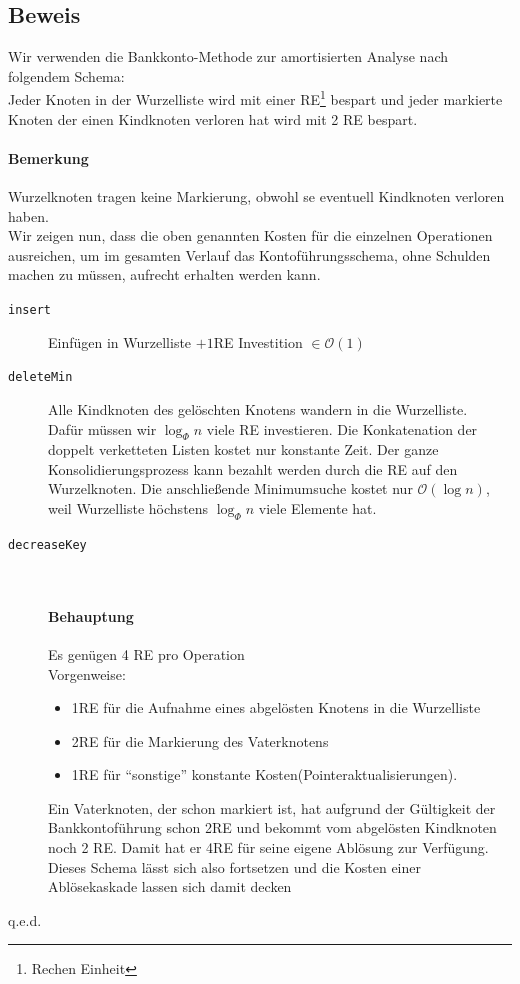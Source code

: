 \subsection{Beweis}
Wir verwenden die Bankkonto-Methode zur amortisierten Analyse nach folgendem Schema:\\
Jeder Knoten in der Wurzelliste wird mit einer RE\footnote{Rechen Einheit} bespart und jeder markierte Knoten der einen Kindknoten verloren hat wird mit 2 RE bespart.
\paragraph{Bemerkung}
Wurzelknoten tragen keine Markierung, obwohl se eventuell Kindknoten verloren haben.\\

Wir zeigen nun, dass die oben genannten Kosten für die einzelnen Operationen ausreichen, um im gesamten Verlauf das Kontoführungsschema, ohne Schulden machen zu müssen, aufrecht erhalten werden kann.\\
\begin{description}
	\item[\texttt{insert}] Einfügen in Wurzelliste $+1$RE Investition $\in\mathcal{O}(1)$\\
	\item[\texttt{deleteMin}] Alle Kindknoten des gelöschten Knotens wandern in die Wurzelliste.\\ Dafür müssen wir $\log_\Phi n$ viele RE investieren. Die Konkatenation der doppelt verketteten Listen kostet nur konstante Zeit. Der ganze Konsolidierungsprozess kann bezahlt werden durch die RE auf den Wurzelknoten. Die anschließende Minimumsuche kostet nur $\mathcal{O}(\log n)$, weil Wurzelliste höchstens $\log_\Phi n$ viele Elemente hat.
	\item[\texttt{decreaseKey}] $ $
	\paragraph{Behauptung} Es genügen 4 RE pro Operation\\
	Vorgenweise:
	\begin{itemize}
		\item 1RE für die Aufnahme eines abgelösten Knotens in die Wurzelliste
		\item 2RE für die Markierung des Vaterknotens
		\item 1RE für "`sonstige"' konstante Kosten(Pointeraktualisierungen).
	\end{itemize}
	Ein Vaterknoten, der schon markiert ist, hat aufgrund der Gültigkeit der Bankkontoführung schon 2RE und bekommt vom abgelösten Kindknoten noch 2 RE. Damit hat er 4RE für seine eigene Ablösung zur Verfügung. Dieses Schema lässt sich also fortsetzen und die Kosten einer Ablösekaskade lassen sich damit decken
\end{description}
\begin{flushright}
	q.e.d.
\end{flushright}